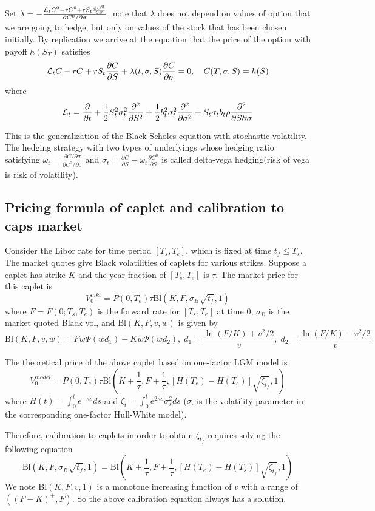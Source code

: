 \documentclass[10pt]{article}
\theoremstyle{plain}
\numberwithin{equation}{section}
\numberwithin{table}{section}
\newcommand{\s}{\sigma}
\newcommand{\om}{\omega}
\newcommand{\pa}{\partial}
\begin{document}
Set $\lambda = - \frac{{\cal{L}}_t C^0 - rC^0 + rS_t \frac{\pa C^0}{\pa S}}{\pa C^0 / \pa \s}$, note that $\lambda$ does not depend on values of option that we are going to hedge, but 
only on values of the stock that has been chosen initially. By replication we arrive at the equation that the price of the option with payoff $h(S_T)$ satisfies
\[
    {\cal{L}}_tC - rC + rS_t \frac{\pa C}{\pa S} + \lambda(t, \s, S) \frac{\pa C}{\pa \s}= 0, \quad C(T, \s, S) = h(S)    
\] 
where 
\[
    {\cal{L}}_t = \frac{\pa}{\pa t} + \frac{1}{2} S_t^2 \s_t^2 \frac{\pa^2}{\pa S^2} + \frac{1}{2} b_t^2 \s_t^2 \frac{\pa^2}{\pa \s^2} + S_t\s_t b_t\rho \frac{\pa^2}{\pa S \pa \s}   
\]

This is the generalization of the Black-Scholes equation with stochastic volatility. The hedging strategy with two types of underlyings whose hedging ratio satisfying $\om_t = \frac{\pa C / \pa \s}{\pa C^0 / \pa \s}$ and 
$\s_t = \frac{\pa C}{\pa S} - \om_t \frac{\pa C^0}{\pa S}$ is called delta-vega hedging(risk of vega is risk of volatility).


\subsection{Pricing formula of caplet and calibration to caps market}

Consider the Libor rate for time period $[T_s, T_e]$, which is fixed at time $t_f \le T_s$. The market quotes give Black volatilities of caplets for various strikes. Suppose a caplet has strike $K$ and the year fraction of $[T_s, T_e]$ is $\tau$. The market price for this caplet is
\[
V_0^{mkt} = P(0,T_e)\tau \mbox{Bl}(K, F, \sigma_B\sqrt{t_f}, 1)
\]
where $F=F(0;T_s, T_e)$ is the forward rate for $[T_s, T_e]$ at time $0$, $\sigma_B$ is the market quoted Black vol, and $\mbox{Bl}(K,F,v,w)$ is given by
\[
\mbox{Bl}(K,F,v,w)=Fw\Phi(wd_1) - Kw\Phi(wd_2), \; d_1 = \frac{\ln(F/K)+v^2/2}{v}, \; d_2 = \frac{\ln(F/K)-v^2/2}{v}
\]

The theoretical price of the above caplet based on one-factor LGM model is
\[
V_0^{model} = P(0,T_e)\tau \mbox{Bl}\left(K+\frac{1}{\tau}, F+\frac{1}{\tau}, \left[H(T_e)-H(T_s)\right] \sqrt{\zeta_{t_f}}, 1\right)
\]
where $H(t) = \int_0^t e^{-\kappa s}ds$ and $\zeta_t = \int_0^t e^{2\kappa s}\sigma_s^2 ds$ ($\sigma_{\cdot}$ is the volatility parameter in the corresponding one-factor Hull-White model).

Therefore, calibration to caplets in order to obtain $\zeta_{t_f}$ requires solving the following equation
\[
\boxed{
\mbox{Bl}(K, F, \sigma_B\sqrt{t_f}, 1) = \mbox{Bl}\left(K+\frac{1}{\tau}, F+\frac{1}{\tau}, \left[H(T_e)-H(T_s)\right] \sqrt{\zeta_{t_f}}, 1\right)
}
\]
We note $\mbox{Bl}(K, F, v, 1)$ is a monotone increasing function of $v$ with a range of $((F-K)^+, F)$. So the above calibration equation always has a solution.
\end{document}
